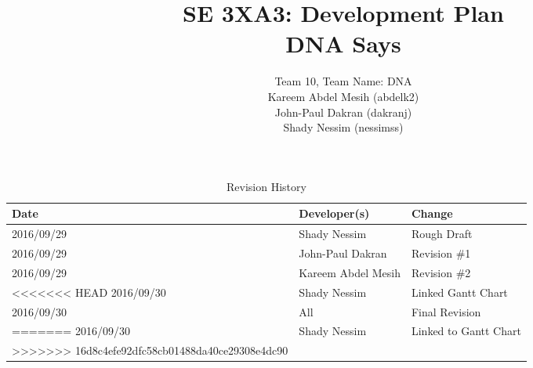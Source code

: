 \documentclass{article}
\title{SE 3XA3: Development Plan\\DNA Says}
\author{Team 10, Team Name: DNA
		\\ Kareem Abdel Mesih (abdelk2)
		\\ John-Paul Dakran (dakranj)
		\\ Shady Nessim (nessimss)
}
\date{}
\begin{document}
\begin{table}[hp]
\caption{Revision History} \label{TblRevisionHistory}
\begin{tabularx}{\textwidth}{llX}
\toprule
\textbf{Date} & \textbf{Developer(s)} & \textbf{Change}\\
\midrule
2016/09/29 & Shady Nessim & Rough Draft\\
2016/09/29 & John-Paul Dakran &  Revision \#1\\
2016/09/29 & Kareem Abdel Mesih &  Revision \#2\\
<<<<<<< HEAD
2016/09/30 & Shady Nessim & Linked Gantt Chart\\
2016/09/30 & All & Final Revision\\
=======
2016/09/30 & Shady Nessim & Linked to Gantt Chart\\
>>>>>>> 16d8c4efe92dfc58cb01488da40ce29308e4dc90
\bottomrule
\end{tabularx}
\end{table}
\newpage
\maketitle
\newpage
\end{document}
